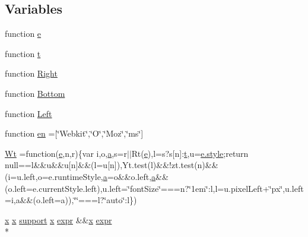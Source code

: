 \subsection*{Variables}
\begin{DoxyCompactItemize}
\item 
function \hyperlink{jquery-1_810_82_8min_8js_a2c038346d47955cbe2cb91e338edd7e1}{e}
\item 
function \hyperlink{jquery-1_810_82_8min_8js_a23c5666e83bbbceee94adcd0851f50c4}{t}
\item 
function \hyperlink{jquery-1_810_82_8min_8js_ac7f66efc33d974809d85fc5bdb00c6eb}{Right}
\item 
function \hyperlink{jquery-1_810_82_8min_8js_aff76c1cba4a00c678dfce0e0c5a5538a}{Bottom}
\item 
function \hyperlink{jquery-1_810_82_8min_8js_abef68bf244a1159a49fe3a2c153a65d2}{Left}
\item 
function \hyperlink{jquery-1_810_82_8min_8js_a5d7a777130eac935addcf4926a74b23c}{en} =\mbox{[}\char`\"{}Webkit\char`\"{},\char`\"{}O\char`\"{},\char`\"{}Moz\char`\"{},\char`\"{}ms\char`\"{}\mbox{]}
\item 
\hyperlink{jquery-1_810_82_8min_8js_acf437e7551a2ce881d7ec2b66e46dc17}{Wt} =function(\hyperlink{jquery-1_810_82_8min_8js_a2c038346d47955cbe2cb91e338edd7e1}{e},n,r)\{var i,o,\hyperlink{bootstrap_8min_8js_a7318f59fb86a4437995ee89c780c51ac}{a},s=r$\vert$$\vert$Rt(\hyperlink{jquery-1_810_82_8min_8js_a2c038346d47955cbe2cb91e338edd7e1}{e}),l=s?s\mbox{[}n\mbox{]}\-:\hyperlink{jquery-1_810_82_8min_8js_a23c5666e83bbbceee94adcd0851f50c4}{t},u=\hyperlink{jquery-1_810_82-vsdoc_8js_af3f76f18e38dd06c0a345ede43abb420}{e.\-style};return null==l\&\&u\&\&u\mbox{[}n\mbox{]}\&\&(l=u\mbox{[}n\mbox{]}),Yt.\-test(l)\&\&!zt.\-test(n)\&\&(i=u.\-left,o=e.\-runtime\-Style,\hyperlink{bootstrap_8min_8js_a7318f59fb86a4437995ee89c780c51ac}{a}=o\&\&o.\-left,\hyperlink{bootstrap_8min_8js_a7318f59fb86a4437995ee89c780c51ac}{a}\&\&(o.\-left=e.\-current\-Style.\-left),u.\-left=\char`\"{}font\-Size\char`\"{}===n?\char`\"{}1em\char`\"{}\-:l,l=u.\-pixel\-Left+\char`\"{}px\char`\"{},u.\-left=i,a\&\&(o.\-left=a)),\char`\"{}\char`\"{}===l?\char`\"{}auto\char`\"{}\-:l\})
\item 
\hyperlink{jquery-1_810_82_8min_8js_a5ce50d751c9664d05375c8f5080ed43e}{x} \hyperlink{jquery-1_810_82_8min_8js_a5ce50d751c9664d05375c8f5080ed43e}{x} \hyperlink{jquery-1_810_82-vsdoc_8js_a1be69652377630fc5432ae5ec6463744}{support} \hyperlink{jquery-1_810_82_8min_8js_a5ce50d751c9664d05375c8f5080ed43e}{x} \hyperlink{jquery-1_810_82-vsdoc_8js_aaacd1d5b3593ba4dfff6d67d4f6cfda1}{expr} \&\&\hyperlink{jquery-1_810_82_8min_8js_a5ce50d751c9664d05375c8f5080ed43e}{x} \hyperlink{jquery-1_810_82-vsdoc_8js_aaacd1d5b3593ba4dfff6d67d4f6cfda1}{expr} \\*
$$
\end{DoxyCompactItemize}

